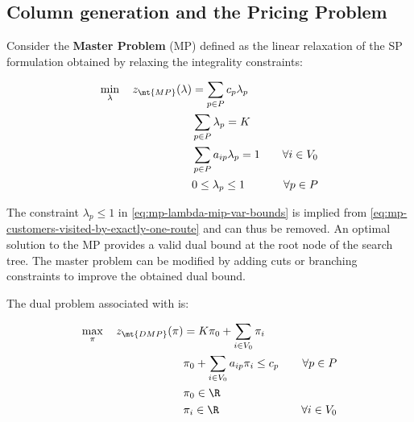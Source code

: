 \subsection{Column generation and the Pricing Problem}
\label{sec:column-generation-and-pricing-problem}

Consider the \textbf{Master Problem} (MP) defined
as the linear relaxation of the SP formulation obtained by relaxing the integrality constraints:

\begin{align}
	\min_{\lambda} \quad z_\mt{MP}(\lambda) & = \sum_{p \in P}  c_p \lambda_p \label{eq:mp-obj-func}                                                                                                                             \\
	                                        & \sum_{p \in P} \lambda_{p} = K\label{eq:mp-K-routes}                                                                                                                               \\
	                                        & \sum_{p \in P}  a_{ip} \lambda_p = 1                   & \quad \forall i \in V_0                                              \label{eq:mp-customers-visited-by-exactly-one-route} \\
	                                        & 0 \le \lambda_p \le 1                                  & \quad \forall p \in P \label{eq:mp-lambda-mip-var-bounds}
\end{align}


The constraint $\lambda_p \le 1$ in \cref{eq:mp-lambda-mip-var-bounds} is implied from \cref{eq:mp-customers-visited-by-exactly-one-route} and can thus be removed.
An optimal solution to the MP provides a valid dual bound at the root node of the search tree.
The master problem can be modified by adding cuts or branching constraints to improve the obtained dual bound.

The dual problem associated with 
is:

\begin{align}
	\max_{\pi} \quad z_\mt{DMP}(\pi) & =  K \pi_0 + \sum_{i \in V_0} \pi_i \label{eq:dmp-obj-func}                                                    \\
	                                 & \pi_0 + \sum_{i \in V_0} a_{ip} \pi_i \le c_p               & \quad \forall p \in P \label{eq:dmp-constraint1} \\
	                                 & \pi_0 \in \R &  \label{eq:dmp-constraint2} \\
	                                 & \pi_i \in \R &  \quad \forall i \in V_0 \label{eq:dmp-constraint3}
\end{align}


